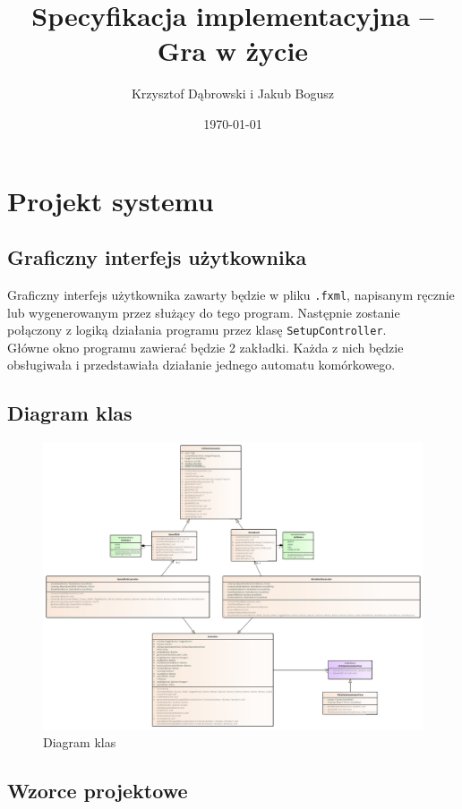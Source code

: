 \documentclass{report}
\title{Specyfikacja implementacyjna -- Gra w życie}
\author{Krzysztof Dąbrowski i Jakub Bogusz}
\date{\today}
\begin{document}
\maketitle{}

\tableofcontents{}

\chapter{Projekt systemu}

\section{Graficzny interfejs użytkownika}
Graficzny interfejs użytkownika zawarty będzie w pliku \texttt{.fxml}, napisanym ręcznie lub wygenerowanym przez służący do tego program. Następnie zostanie połączony z logiką działania programu przez klasę \texttt{SetupController}. \\
Główne okno programu zawierać będzie 2 zakładki. Każda z nich będzie obsługiwała i przedstawiała działanie jednego automatu komórkowego.
\section{Diagram klas}
\begin{figure}
	\hspace*{-3cm}\includegraphics[width=18cm]{Klasy}
	\caption{Diagram klas}	
\end{figure}	

\section{Wzorce projektowe}
\end{document}
